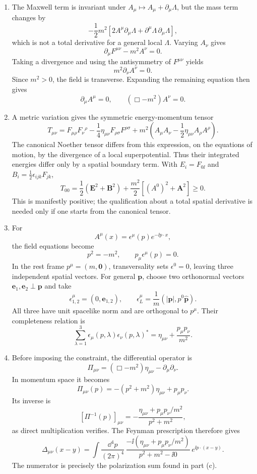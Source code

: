 
\begin{enumerate}
\begin{enumerate}
\item
The Maxwell term is invariant under
\(A_\mu\mapsto A_\mu+\partial_\mu\Lambda\), but the mass term changes by
\[
 -\frac12m^2\left[
 2A^\mu\partial_\mu\Lambda
 +\partial^\mu\Lambda\,\partial_\mu\Lambda\right],
\]
which is not a total derivative for a general local \(\Lambda\).  Varying
\(A_\nu\) gives
\[
 \partial_\mu F^{\mu\nu}-m^2A^\nu=0.
\]
Taking a divergence and using the antisymmetry of \(F^{\mu\nu}\) yields
\[
 m^2\partial_\nu A^\nu=0.
\]
Since \(m^2>0\), the field is transverse.  Expanding the remaining
equation then gives
\[
 \boxed{\partial_\mu A^\mu=0,\qquad
 (\Box-m^2)A^\nu=0.}
\]

\item
A metric variation gives the symmetric energy-momentum tensor
\[
 T_{\mu\nu}
 =F_{\mu\rho}F_\nu{}^\rho
 -\frac14\eta_{\mu\nu}F_{\rho\sigma}F^{\rho\sigma}
 +m^2\left(A_\mu A_\nu-\frac12\eta_{\mu\nu}A_\rho A^\rho\right).
\]
The canonical Noether tensor differs from this expression, on the equations
of motion, by the divergence of a local superpotential.  Thus their
integrated energies differ only by a spatial boundary term.  With
\(E_i=F_{0\ii}\) and \(B_i=\frac12\epsilon_{ijk}F_{jk}\),
\[
 \boxed{
 T_{00}
 =\frac12\left(\mathbf E^2+\mathbf B^2\right)
 +\frac{m^2}{2}\left[(A^0)^2+\mathbf A^2\right]\geq0.}
\]
This is manifestly positive; the qualification about a total spatial
derivative is needed only if one starts from the canonical tensor.

\item
For
\[
 A^\mu(x)=\epsilon^\mu(p)e^{-\ii p\cdot x},
\]
the field equations become
\[
 p^2=-m^2,\qquad p_\mu\epsilon^\mu(p)=0.
\]
In the rest frame \(p^\mu=(m,\mathbf0)\), transversality sets
\(\epsilon^0=0\), leaving three independent spatial vectors.  For general
\(\mathbf p\), choose two orthonormal vectors
\(\mathbf e_1,\mathbf e_2\perp\mathbf p\) and take
\[
 \epsilon^\mu_{1,2}=(0,\mathbf e_{1,2}),\qquad
 \epsilon^\mu_L
 =\frac1m\left(|\mathbf p|,p^0\widehat{\mathbf p}\right).
\]
All three have unit spacelike norm and are orthogonal to \(p^\mu\).  Their
completeness relation is
\[
 \sum_{\lambda=1}^{3}
 \epsilon_\mu(p,\lambda)\epsilon_\nu(p,\lambda)^*
 =\eta_{\mu\nu}+\frac{p_\mu p_\nu}{m^2}.
\]

\item
Before imposing the constraint, the differential operator is
\[
 \Pi_{\mu\nu}
 =(\Box-m^2)\eta_{\mu\nu}-\partial_\mu\partial_\nu .
\]
In momentum space it becomes
\[
 \Pi_{\mu\nu}(p)
 =-(p^2+m^2)\eta_{\mu\nu}+p_\mu p_\nu .
\]
Its inverse is
\[
 [\Pi^{-1}(p)]_{\mu\nu}
 =-\frac{\eta_{\mu\nu}+p_\mu p_\nu/m^2}{p^2+m^2},
\]
as direct multiplication verifies.  The Feynman prescription therefore
gives
\[
 \boxed{
 \Delta_{\mu\nu}(x-y)
 =\int\frac{\dd^4p}{(2\pi)^4}\,
 \frac{-\ii\left(\eta_{\mu\nu}+p_\mu p_\nu/m^2\right)}
 {p^2+m^2-\ii0}\,
 e^{\ii p\cdot(x-y)} .}
\]
The numerator is precisely the polarization sum found in part (c).
\end{enumerate}


\end{enumerate}
